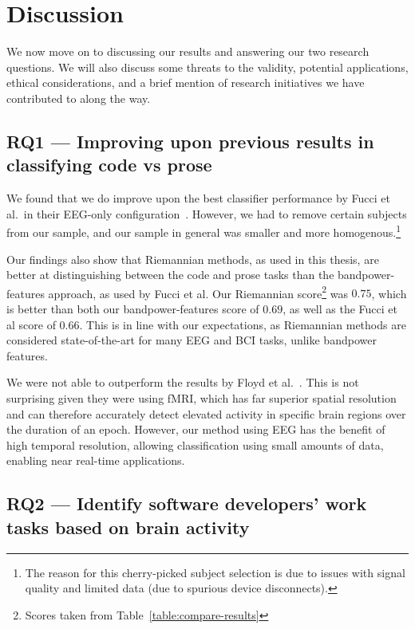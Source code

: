 \chapter{Discussion}\label{section:discussion}

We now move on to discussing our results and answering our two research questions. We will also discuss some threats to the validity, potential applications, ethical considerations, and a brief mention of research initiatives we have contributed to along the way.

\section{RQ1 --- Improving upon previous results in classifying code vs prose}

We found that we do improve upon the best classifier performance by Fucci et al.\ in their EEG-only configuration~\cite{fucci_replication_2019}. However, we had to remove certain subjects from our sample, and our sample in general was smaller and more homogenous.\footnote{The reason for this cherry-picked subject selection is due to issues with signal quality and limited data (due to spurious device disconnects).}

Our findings also show that Riemannian methods, as used in this thesis, are better at distinguishing between the code and prose tasks than the bandpower-features approach, as used by Fucci et al. Our Riemannian score\footnote{Scores taken from Table~\ref{table:compare-results}} was $0.75$, which is better than both our bandpower-features score of $0.69$, as well as the Fucci et al score of $0.66$. This is in line with our expectations, as Riemannian methods are considered state-of-the-art for many EEG and BCI tasks, unlike bandpower features.

We were not able to outperform the results by Floyd et al.~\cite{floyd_decoding_2017}. This is not surprising given they were using fMRI, which has far superior spatial resolution and can therefore accurately detect elevated activity in specific brain regions over the duration of an epoch. However, our method using EEG has the benefit of high temporal resolution, allowing classification using small amounts of data, enabling near real-time applications.

\section{RQ2 --- Identify software developers' work tasks based on brain activity}

